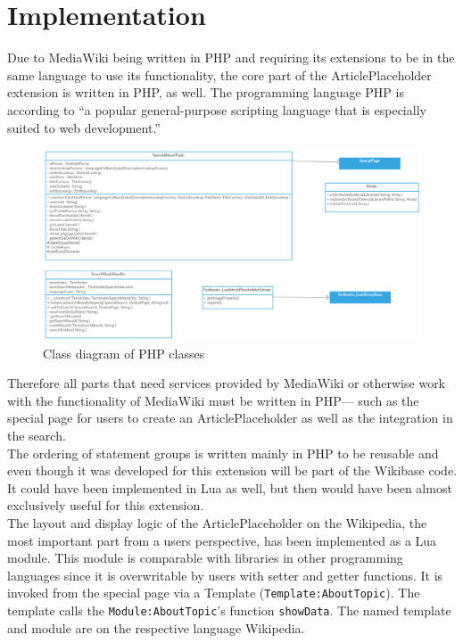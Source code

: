\chapter{Implementation}
	
	Due to MediaWiki being written in PHP and requiring its extensions to be in the same language to use its functionality, the core part of the ArticlePlaceholder extension is written in PHP, as well. The programming language PHP is according to \citep{php:01} ``a popular general-purpose scripting language that is especially suited to web development.'' \\
	\begin{figure}[H]
		\centering
		\includegraphics[width=\textwidth]{diagrams/ArticlePlaceholderClassDiagram.png}
		\caption{Class diagram of PHP classes}
		\label{fig:ClassDiagramPHP}
	\end{figure}
	Therefore all parts that need services provided by MediaWiki or otherwise work with the functionality of MediaWiki must be written in PHP--- such as the special page for users to create an ArticlePlaceholder as well as the integration in the search. \\
	The ordering of statement groups is written mainly in PHP to be reusable and even though it was developed for this extension will be part of the Wikibase code. It could have been implemented in Lua as well, but then would have been almost exclusively useful for this extension. \\
	The layout and display logic of the ArticlePlaceholder on the Wikipedia, the most important part from a users perspective, has been implemented as a Lua module. This module is comparable with libraries in other programming languages since it is overwritable by users with setter and getter functions. It is invoked from the special page via a Template (\texttt{\justify Template:AboutTopic}). The template calls the \texttt{\justify Module:AboutTopic}'s function \texttt{\justify showData}. The named template and module are on the respective language Wikipedia. \\
	
	
	
	
	
	
	
	
	
	